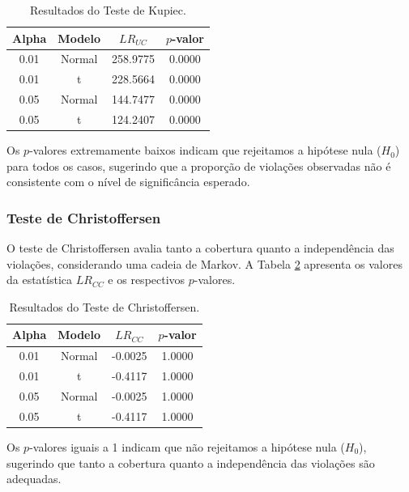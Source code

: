 \documentclass[a4paper, 12pt]{article}
\begin{document}
\begin{table}[H]
    \centering
    \caption{Resultados do Teste de Kupiec.}
    \label{tab:kupiec}
    \begin{tabular}{cccc}
        \hline
        \textbf{Alpha} & \textbf{Modelo} & \textbf{\(LR_{UC}\)} & \textbf{\(p\)-valor} \\
        \hline
        0.01 & Normal & 258.9775 & 0.0000 \\
        0.01 & t      & 228.5664 & 0.0000 \\
        0.05 & Normal & 144.7477 & 0.0000 \\
        0.05 & t      & 124.2407 & 0.0000 \\
        \hline
    \end{tabular}
\end{table}

Os \(p\)-valores extremamente baixos indicam que rejeitamos a hipótese nula (\(H_0\)) para todos os casos, sugerindo que a proporção de violações observadas não é consistente com o nível de significância esperado.

\subsubsection{Teste de Christoffersen}
O teste de Christoffersen avalia tanto a cobertura quanto a independência das violações, considerando uma cadeia de Markov. A Tabela \ref{tab:christoffersen} apresenta os valores da estatística \(LR_{CC}\) e os respectivos \(p\)-valores.

\begin{table}[H]
    \centering
    \caption{Resultados do Teste de Christoffersen.}
    \label{tab:christoffersen}
    \begin{tabular}{cccc}
        \hline
        \textbf{Alpha} & \textbf{Modelo} & \textbf{\(LR_{CC}\)} & \textbf{\(p\)-valor} \\
        \hline
        0.01 & Normal & -0.0025 & 1.0000 \\
        0.01 & t      & -0.4117 & 1.0000 \\
        0.05 & Normal & -0.0025 & 1.0000 \\
        0.05 & t      & -0.4117 & 1.0000 \\
        \hline
    \end{tabular}
\end{table}

Os \(p\)-valores iguais a 1 indicam que não rejeitamos a hipótese nula (\(H_0\)), sugerindo que tanto a cobertura quanto a independência das violações são adequadas.
\end{document}
